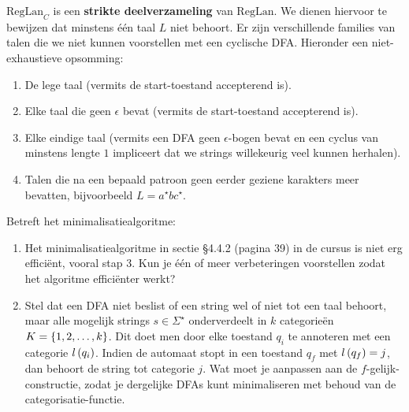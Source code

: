 \documentclass{article}
\begin{document}
\begin{question}
\begin{answer}
$\mbox{RegLan}_C$ is een \textbf{strikte deelverzameling} van $\mbox{RegLan}$. We dienen hiervoor te bewijzen dat minstens \'e\'en taal $L$ niet behoort. Er zijn verschillende families van talen die we niet kunnen voorstellen met een cyclische DFA. Hieronder een niet-exhaustieve opsomming:
\begin{enumerate}
 \item De lege taal (vermits de start-toestand accepterend is).
 \item Elke taal die geen $\epsilon$ bevat (vermits de start-toestand accepterend is).
 \item Elke eindige taal (vermits een DFA geen $\epsilon$-bogen bevat en een cyclus van minstens lengte $1$ impliceert dat we strings willekeurig veel kunnen herhalen).
 \item Talen die na een bepaald patroon geen eerder geziene karakters meer bevatten, bijvoorbeeld $L=a^{\star}bc^{\star}$.
\end{enumerate}

\end{answer}
\end{question}

\begin{question}
Betreft het minimalisatiealgoritme:
\begin{enumerate}
 \item Het minimalisatiealgoritme in sectie \S4.4.2 (pagina 39) in de cursus is niet erg effici\"ent, vooral stap 3. Kun je \'e\'en of meer verbeteringen voorstellen zodat het algoritme effici\"enter werkt?
 \item Stel dat een DFA niet beslist of een string wel of niet tot een taal behoort, maar alle mogelijk strings $s\in\Sigma^{\star}$ onderverdeelt in $k$ categorie\"en $K=\left\{ 1,2,\ldots,k \right\}$. Dit doet men door elke toestand $q_i$ te annoteren met een categorie $l\left( q_i \right)$. Indien de automaat stopt in een toestand $q_f$ met $l\left( q_f \right)=j$, dan behoort de string tot categorie $j$. Wat moet je aanpassen aan de $f$-gelijk-constructie, zodat je dergelijke DFAs kunt minimaliseren met behoud van de categorisatie-functie.
\end{enumerate}
\begin{answer}

\end{answer}
\end{question}
\end{document}
